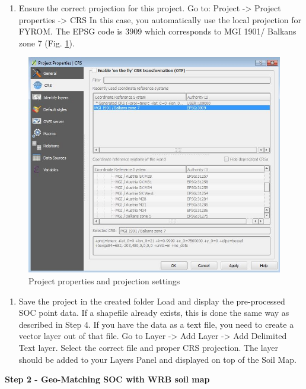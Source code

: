 \documentclass[10pt,b5paper,]{book}
\providecommand{\tightlist}{%
  \setlength{\itemsep}{0pt}\setlength{\parskip}{0pt}}
\theoremstyle{definition}
\theoremstyle{definition}
\theoremstyle{definition}
\theoremstyle{remark}
\begin{document}
\begin{enumerate}
\def\labelenumi{\arabic{enumi}.}
\setcounter{enumi}{5}
\tightlist
\item
  Ensure the correct projection for this project. Go to: Project
  -\textgreater{} Project properties -\textgreater{} CRS In this case,
  you automatically use the local projection for FYROM. The EPSG code is
  3909 which corresponds to MGI 1901/ Balkans zone 7 (Fig.
  \ref{fig:qgisepsg}).
\end{enumerate}

\begin{figure}

{\centering \includegraphics[width=0.8\linewidth]{images/Conv_upscaling3} 

}

\caption{Project properties and projection settings}\label{fig:qgisepsg}
\end{figure}

\begin{enumerate}
\def\labelenumi{\arabic{enumi}.}
\setcounter{enumi}{6}
\tightlist
\item
  Save the project in the created folder Load and display the
  pre-processed SOC point data. If a shapefile already exists, this is
  done the same way as described in Step 4. If you have the data as a
  text file, you need to create a vector layer out of that file. Go to
  Layer -\textgreater{} Add Layer -\textgreater{} Add Delimited Text
  layer. Select the correct file and proper CRS projection. The layer
  should be added to your Layers Panel and displayed on top of the Soil
  Map.
\end{enumerate}

\textbf{Step 2 - Geo-Matching SOC with WRB soil map}
\end{document}
